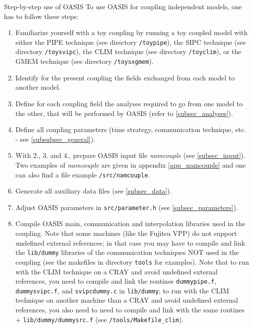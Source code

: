 \newpage
\begin{section}{Step-by-step use of OASIS}
\label{sec_step}
To use OASIS for coupling independent models, one has to follow these
steps:
\begin{enumerate}
\item Familiarize yourself with a toy coupling by running a toy
coupled model with either the PIPE technique 
(see directory {\tt /toypipe}), the SIPC technique 
(see directory {\tt /toysvipc}), the CLIM technique
(see directory {\tt /toyclim}), or the GMEM technique 
(see directory {\tt /toysxgmem}).
\item Identify for the present coupling the fields exchanged from 
each model to another model.
\item Define for each coupling field the analyses required to go from 
one model to the other, that will be performed by OASIS (refer to 
\ref{subsec_analyses}).
\item Define all coupling parameters (time strategy, communication 
technique, etc. - see \ref{subsubsec_general}).
\item With 2., 3. and 4., prepare OASIS input file {\em namcouple}
(see \ref{subsec_input}). Two examples of {\em namcouple} are given 
in appendix \ref{app_namcouple} and one can also find a file example 
{\tt /src/namcouple}.

\item Generate all auxiliary data files (see \ref{subsec_data}).

\item Adjust OASIS parameters in {\tt src/parameter.h} (see 
\ref{subsec_parameters}).

\item Compile OASIS main, communication and interpolation libraries used 
in the coupling. Note that some machines (like the Fujitsu VPP) do not 
support undefined external references; in that case you may have to compile 
and link the {\tt lib/dummy} libraries of the communication techniques 
NOT used in the coupling (see the makefiles in directory {\tt tools}
for examples). Note that to run with the CLIM technique on a CRAY and
avoid undefined external references, you
need to compile and link the routines {\tt dummypipe.f}, 
{\tt dummysvipc.f}, and {\tt svipcdummy.c} in {\tt lib/dummy}; to
run with the CLIM technique on another machine than a CRAY and
avoid undefined external references, you also
need to need to compile and link with the same routines + 
{\tt lib/dummy/dummysrc.f} (see {\tt /tools/Makefile\_clim}).
 

\end{enumerate}
\end{section}
